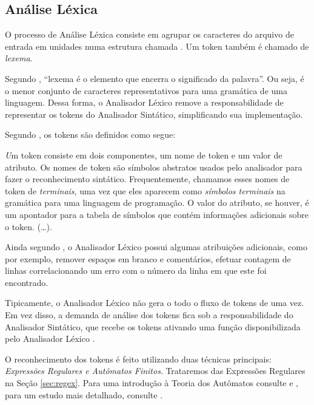 \subsection{Análise Léxica}

O processo de Análise Léxica consiste em agrupar os caracteres do arquivo de
entrada em unidades numa estrutura chamada \token. Um token também é chamado
de \emph{lexema}.

Segundo , ``lexema é o elemento que encerra o
significado da palavra''. Ou seja, é o menor conjunto de caracteres
representativos para uma gramática de uma linguagem. Dessa forma, o Analisador
Léxico remove a responsabilidade de representar os tokens do Analisador
Sintático, simplificando sua implementação.

Segundo , os tokens são definidos como segue:

\begin{citacao}{4cm}{0cm}\footnotesize \emph
	Um token consiste em dois componentes, um nome de token e um valor de
	atributo. Os nomes de token são símbolos abstratos usados pelo analisador para
	fazer o reconhecimento sintático. Frequentemente, chamamos esses nomes de
	token de \emph{terminais}, uma vez que eles aparecem como \emph{símbolos
	terminais} na gramática para uma linguagem de programação. O valor do
	atributo, se houver, é um apontador para a tabela de símbolos que contém
	informações adicionais sobre o token. (\ldots).
\end{citacao}

Ainda segundo , o Analisador Léxico possui algumas
atribuições adicionais, como por exemplo, remover espaços em branco e
comentários, efetuar contagem de linhas correlacionando um erro com o número
da linha em que este foi encontrado.

Tipicamente, o Analisador Léxico não gera o todo o fluxo de tokens de uma vez.
Em vez disso, a demanda de análise dos tokens fica sob a responsabilidade do
Analisador Sintático, que recebe os tokens ativando uma função disponibilizada
pelo Analisador Léxico \cite{louden97-pt}.

O reconhecimento dos tokens é feito utilizando duas técnicas principais:
\emph{Expressões Regulares e Autômatos Finitos}. Trataremos das Expressões
Regulares na Seção \ref{sec:regex}. Para uma introdução à Teoria dos Autômatos
consulte  e  , para um estudo
mais detalhado, consulte .

